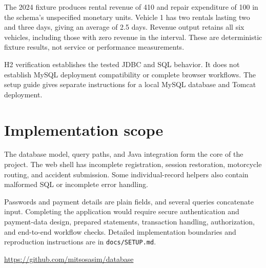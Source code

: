 \documentclass[10pt,a4paper]{article}
\begin{document}
The 2024 fixture produces rental revenue of 410 and repair expenditure of 100 in the schema's unspecified monetary units. Vehicle 1 has two rentals lasting two and three days, giving an average of 2.5 days. Revenue output retains all six vehicles, including those with zero revenue in the interval. These are deterministic fixture results, not service or performance measurements.

H2 verification establishes the tested JDBC and SQL behavior. It does not establish MySQL deployment compatibility or complete browser workflows. The setup guide gives separate instructions for a local MySQL database and Tomcat deployment.

\section*{Implementation scope}
The database model, query paths, and Java integration form the core of the project. The web shell has incomplete registration, session restoration, motorcycle routing, and accident submission. Some individual-record helpers also contain malformed SQL or incomplete error handling.

Passwords and payment details are plain fields, and several queries concatenate input. Completing the application would require secure authentication and payment-data design, prepared statements, transaction handling, authorization, and end-to-end workflow checks. Detailed implementation boundaries and reproduction instructions are in \texttt{docs/SETUP.md}.

\vfill
{\small\color{ink}\url{https://github.com/mitsosasim/database}}
\end{document}
